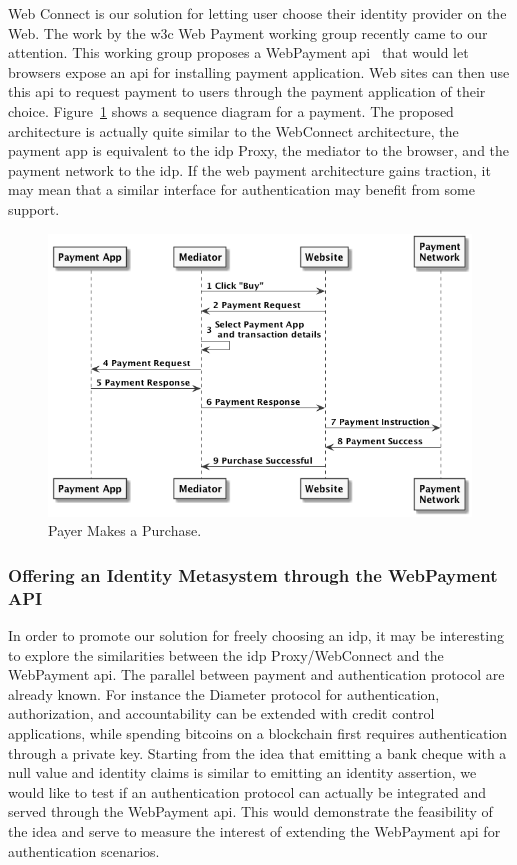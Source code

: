 Web Connect is our solution for letting user choose their identity provider on the Web. 
The work by the \gls{w3c} Web Payment working group recently came to our attention.
This working group proposes a WebPayment \gls{api}~\cite{Denicola:18:PRA} that would let browsers expose an \gls{api} for installing payment application.
Web sites can then use this \gls{api} to request payment to users through the payment application of their choice.
Figure~\ref{fig:webpay} shows a sequence diagram for a payment.
The proposed architecture is actually quite similar to the WebConnect architecture, \ie the payment app is equivalent to the \gls{idp} Proxy, the mediator to the browser, and the payment network to the \gls{idp}.
If the web payment architecture gains traction, it may mean that a similar interface for authentication may benefit from some support. 

\begin{figure}
\centering
\includegraphics[width=\textwidth]{images/webpayment}
\caption{Payer Makes a Purchase.}
\label{fig:webpay}
\end{figure}


\subsubsection{Offering an Identity Metasystem through the WebPayment API}
In order to promote our solution for freely choosing an \gls{idp}, it may be interesting to explore the similarities between the \gls{idp} Proxy/WebConnect and the WebPayment \gls{api}. 
The parallel between payment and authentication protocol are already known.
For instance the Diameter protocol for authentication, authorization, and accountability can be extended with credit control applications, while spending bitcoins on a blockchain first requires authentication through a private key.
Starting from the idea that emitting a bank cheque with a null value and identity claims is similar to emitting an identity assertion, we would like to test if an authentication protocol can actually be integrated and served through the WebPayment \gls{api}.
This would demonstrate the feasibility of the idea and serve to measure the interest of extending the WebPayment \gls{api} for authentication scenarios.


